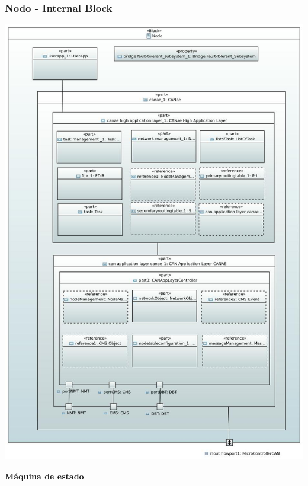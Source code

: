 \begin{frame}[c]
	\frametitle{Nodo - Internal Block}
	\centering
	\includegraphics[scale=0.4]{images/NodeInternalDiagram.JPG}
\end{frame}

\begin{frame}[c]
	\centering
	\LARGE \textbf{Máquina de estado}
\end{frame}

